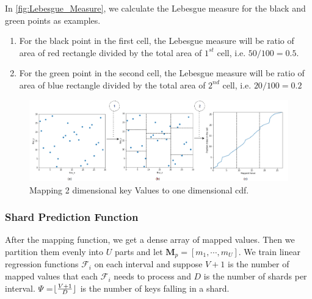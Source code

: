 \begin{mscexample}
	In \ref{fig:Lebesgue_Measure}, we calculate the Lebesgue measure for the black and green points as examples.
	\begin{enumerate}
		\item For the black point in the first cell, the Lebesgue measure will be ratio of area of red rectangle divided by the total area of $1^{st}$ cell, i.e. $50/100=0.5$.
		\item For the green point in the second cell, the Lebesgue measure will be ratio of area of blue rectangle divided by the total area of $2^{nd}$ cell, i.e. $20/100= 0.2$ 
	\end{enumerate}
\end{mscexample}

\begin{figure}[t]
    \centering
    \includegraphics[width=1\textwidth]{graphs/Mapped_cdf.png}
    \caption{Mapping 2 dimensional key Values to one dimensional cdf.} 
    \label{fig:Mapped_Cdf}
\end{figure}

\subsubsection{Shard Prediction Function}

After the mapping function, we get a dense array of mapped values. Then we partition them evenly into $U$ parts and let $\boldsymbol{M}_p=[m_1,\cdots, m_U]$. We train linear regression functions $\mathcal{F}_i$ on each interval and suppose $V+1$ is the number of mapped values that each $\mathcal{F}_i$ needs to process and $D$ is the number of shards per interval. $\Psi$ =$\lfloor\frac{V+1}{D}\rfloor$ is the number of keys falling in a shard. %

